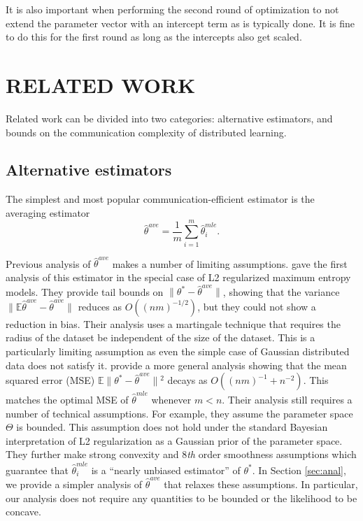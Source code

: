 \documentclass[twoside]{article}
\newcommand{\E}{\mathbb{E}}
\newcommand{\w}{\theta}
\newcommand{\wave}{\hat\w^{ave}}
\newcommand{\wmle}{\hat\w^{mle}}
\newcommand{\wstar}{{\w^{*}}}
\newcommand{\ltwo}[1]{{\lVert {#1} \rVert}}
\begin{document}
It is also important when performing the second round of optimization to not extend the parameter vector with an intercept term as is typically done.
It is fine to do this for the first round as long as the intercepts also get scaled.

\section{RELATED WORK}

Related work can be divided into two categories:
alternative estimators,
and bounds on the communication complexity of distributed learning.

\subsection{Alternative estimators}
\label{sec:alt}
The simplest and most popular communication-efficient estimator is the averaging estimator
\begin{equation}
\wave = \frac{1}{m}\sum_{i=1}^m \wmle_i
.
\end{equation}

Previous analysis of $\wave$ makes a number of limiting assumptions.
\cite{mcdonald2009efficient} gave the first analysis of this estimator in the special case of L2 regularized maximum entropy models.
They provide tail bounds on $\ltwo{\wstar-\wave}$, showing that the variance $\ltwo{\E\wave-\wave}$ reduces as $O((nm)^{-1/2})$,
but they could not show a reduction in bias.
Their analysis uses a martingale technique that requires the radius of the dataset be independent of the size of the dataset.
This is a particularly limiting assumption as even the simple case of Gaussian distributed data does not satisfy it.
\cite{zhang2012communication} provide a more general analysis showing that the mean squared error (MSE) $\E\ltwo{\wstar-\wave}{}^2$ decays as $O((nm)^{-1} + n^{-2})$.
This matches the optimal MSE of $\wmle$ whenever $m<n$.
Their analysis still requires a number of technical assumptions.
For example, they assume the parameter space $\Theta$ is bounded.
This assumption does not hold under the standard Bayesian interpretation of L2 regularization as a Gaussian prior of the parameter space.
They further make strong convexity and 8\emph{th} order smoothness assumptions which guarantee that $\wmle_i$ is a ``nearly unbiased estimator'' of $\wstar$.
In Section \ref{sec:anal}, we provide a simpler analysis of $\wave$ that relaxes these assumptions.
In particular, our analysis does not require any quantities to be bounded or the likelihood to be concave.
\end{document}
